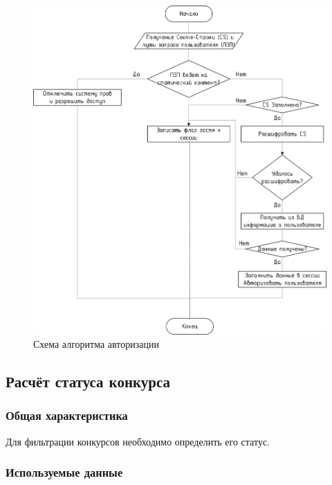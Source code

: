 \begin{figure}[h!]
	\begin{center}
		\begin{minipage}[h]{\linewidth}
			\includegraphics[width=\linewidth]{images/algo-authorize.png}
			\caption{Схема алгоритма авторизации}
			\label{img:algo-authorize}
		\end{minipage}
		\hfill
	\end{center}
\end{figure}  

\subsection{Расчёт статуса конкурса}

\subsubsection*{Общая характеристика}

Для фильтрации конкурсов необходимо определить его статус.

\subsubsection*{Используемые данные}

